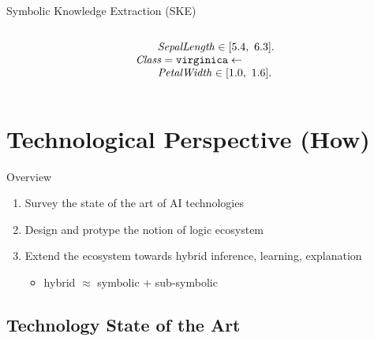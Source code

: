 \documentclass[presentation]{beamer}\mode<presentation>{\usetheme{AMSBolognaFC}}
\begin{document}
\begin{frame}[allowframebreaks]{Symbolic Knowledge Extraction (SKE)}
\begin{columns}
\begin{column}{.53\linewidth}
\[\begin{array}{l}
                        \qquad \mathit{SepalLength} \in [5.4,\ 6.3] \mathtt{.}
                    \\
                    \mathit{Class} = \mathtt{virginica} \leftarrow \\ 
                        \qquad \mathit{PetalWidth} \in [1.0,\ 1.6] \mathtt{.}
                \end{array}    
            \]
        \end{column}
    \end{columns}
\end{frame}



\section{Technological Perspective (How)}

\begin{frame}{Overview}
    \begin{enumerate}
        \item \alert{Survey} the state of the art of AI \alert{technologies}
        
        \vfill

        \item Design and protype the notion of \alert{logic ecosystem}
        
        \vfill

        \item \alert{Extend} the ecosystem towards \alert{hybrid} inference, learning, explanation
        \begin{itemize}
            \item hybrid $\approx$ symbolic + sub-symbolic
        \end{itemize}
    \end{enumerate}
\end{frame}

\subsection{Technology State of the Art}
\end{document}
